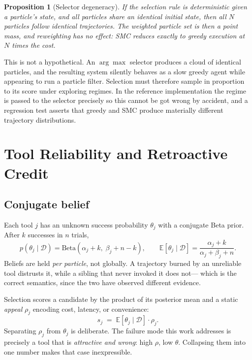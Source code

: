 \documentclass[11pt,a4paper]{article}
\newtheorem{proposition}{Proposition}
\begin{document}
\begin{proposition}[Selector degeneracy]
\label{prop:diversity}
If the selection rule is deterministic given a particle's state, and all
particles share an identical initial state, then all $N$ particles follow
identical trajectories. The weighted particle set is then a point mass, and
reweighting has no effect: SMC reduces exactly to greedy execution at $N$
times the cost.
\end{proposition}

This is not a hypothetical. An $\arg\max$ selector produces a cloud of
identical particles, and the resulting system silently behaves as a slow greedy
agent while appearing to run a particle filter. Selection must therefore sample
in proportion to its score under exploring regimes. In the reference
implementation the regime is passed to the selector precisely so this cannot be
got wrong by accident, and a regression test asserts that greedy and SMC
produce materially different trajectory distributions.

\section{Tool Reliability and Retroactive Credit}
\label{sec:reliability}

\subsection{Conjugate belief}

Each tool $j$ has an unknown success probability $\theta_j$ with a conjugate
Beta prior. After $k$ successes in $n$ trials,
\begin{equation}
p(\theta_j \mid \mathcal{D}) = \mathrm{Beta}(\alpha_j + k,\; \beta_j + n - k),
\qquad
\mathbb{E}[\theta_j \mid \mathcal{D}] = \frac{\alpha_j + k}{\alpha_j + \beta_j + n}.
\end{equation}
Beliefs are held \emph{per particle}, not globally. A trajectory burned by an
unreliable tool distrusts it, while a sibling that never invoked it does not---
which is the correct semantics, since the two have observed different evidence.

Selection scores a candidate by the product of its posterior mean and a static
\emph{appeal} $\rho_j$ encoding cost, latency, or convenience:
\begin{equation}
s_j \;=\; \mathbb{E}[\theta_j \mid \mathcal{D}] \cdot \rho_j .
\label{eq:score}
\end{equation}
Separating $\rho_j$ from $\theta_j$ is deliberate. The failure mode this work
addresses is precisely a tool that is \emph{attractive and wrong}: high $\rho$,
low $\theta$. Collapsing them into one number makes that case
inexpressible.
\end{document}
